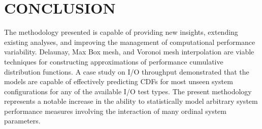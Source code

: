 \documentclass[letterpaper, 10 pt, conference]{ieeeconf}  %
\begin{document}
\section{CONCLUSION}
\label{sec:conclusion}

The methodology presented is capable of providing new insights, extending existing analyses, and improving the management of computational performance variability. Delaunay, Max Box mesh, and Voronoi mesh interpolation are viable techniques for constructing approximations of performance cumulative distribution functions. A case study on I/O throughput demonstrated that the models are capable of effectively predicting CDFs for most unseen system configurations for any of the available I/O test types. The present methodology represents a notable increase in the ability to statistically model arbitrary system performance measures involving the interaction of many ordinal system parameters.



\end{document}
